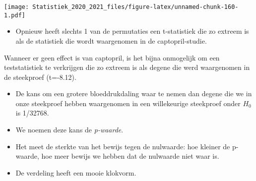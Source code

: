 \documentclass[
  12pt,dutch,coursenotes]{book}
\newenvironment{Shaded}{\begin{snugshade}}{\end{snugshade}}
\newcommand{\DataTypeTok}[1]{\textcolor[rgb]{0.13,0.29,0.53}{#1}}
\newcommand{\DecValTok}[1]{\textcolor[rgb]{0.00,0.00,0.81}{#1}}
\newcommand{\KeywordTok}[1]{\textcolor[rgb]{0.13,0.29,0.53}{\textbf{#1}}}
\newcommand{\NormalTok}[1]{#1}
\newcommand{\OperatorTok}[1]{\textcolor[rgb]{0.81,0.36,0.00}{\textbf{#1}}}
\newcommand{\StringTok}[1]{\textcolor[rgb]{0.31,0.60,0.02}{#1}}
\providecommand{\tightlist}{%
  \setlength{\itemsep}{0pt}\setlength{\parskip}{0pt}}
\theoremstyle{definition}
\theoremstyle{definition}
\theoremstyle{definition}
\theoremstyle{remark}
\begin{document}
\begin{Shaded}
\end{Shaded}

\texttt{[image: Statistiek\_2020\_2021\_files/figure-latex/unnamed-chunk-160-1.pdf]}

\begin{itemize}
\tightlist
\item
  Opnieuw heeft slechts 1 van de permutaties een t-statistiek die zo extreem is als de statistiek die wordt waargenomen in de captopril-studie.
\end{itemize}

Wanneer er geen effect is van captopril, is het bijna onmogelijk om een teststatistiek te verkrijgen die zo extreem is als degene die werd waargenomen in de steekproef (t=-8.12).

\begin{itemize}
\item
  De kans om een grotere bloeddrukdaling waar te nemen dan degene die we in onze steekproef hebben waargenomen in een willekeurige steekproef onder \(H_0\) is 1/32768.
\item
  We noemen deze kans de \emph{p-waarde}.
\item
  Het meet de sterkte van het bewijs tegen de nulwaarde: hoe kleiner de p-waarde, hoe meer bewijs we hebben dat de nulwaarde niet waar is.
\item
  De verdeling heeft een mooie klokvorm.
\end{itemize}
\end{document}
